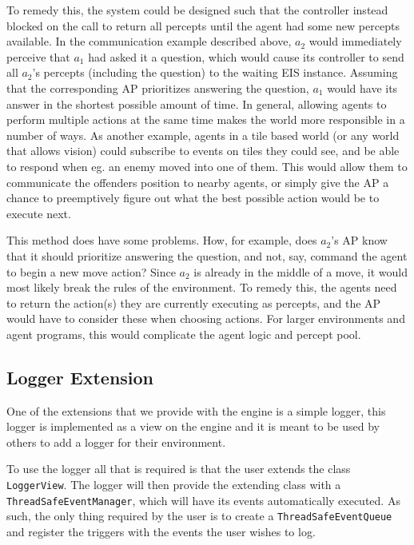 To remedy this, the system could be designed such that the controller
instead blocked on the call to return all percepts until the agent
had some new percepts available. In the communication example described
above, $a_{2}$ would immediately perceive that $a_{1}$ had asked
it a question, which would cause its controller to send all $a_{2}$'s
percepts (including the question) to the waiting EIS instance. Assuming
that the corresponding AP prioritizes answering the question, $a_{1}$
would have its answer in the shortest possible amount of time. In
general, allowing agents to perform multiple actions at the same time
makes the world more responsible in a number of ways. As another example,
agents in a tile based world (or any world that allows vision) could
subscribe to events on tiles they could see, and be able to respond
when eg. an enemy moved into one of them. This would allow them to
communicate the offenders position to nearby agents, or simply give
the AP a chance to preemptively figure out what the best possible
action would be to execute next.

This method does have some problems. How, for example, does $a_{2}$'s
AP know that it should prioritize answering the question, and not,
say, command the agent to begin a new move action? Since $a_{2}$
is already in the middle of a move, it would most likely break the
rules of the environment. To remedy this, the agents need to return
the action(s) they are currently executing as percepts, and the AP
would have to consider these when choosing actions. For larger environments
and agent programs, this would complicate the agent logic and percept
pool.


\subsection{Logger Extension}

One of the extensions that we provide with the engine is a simple
logger, this logger is implemented as a view on the engine and it
is meant to be used by others to add a logger for their environment.

To use the logger all that is required is that the user extends the
class \texttt{LoggerView}. The logger will then provide the extending
class with a \texttt{ThreadSafeEventManager}, which will have its
events automatically executed. As such, the only thing required by
the user is to create a \texttt{ThreadSafeEventQueue }and register
the triggers with the events the user wishes to log. 

